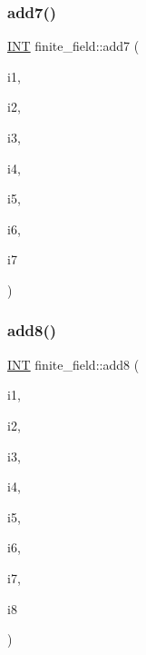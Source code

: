 \mbox{\label{classfinite__field_a19120d114e955baea2cf5d27c459fac1}} 
\subsubsection{\texorpdfstring{add7()}{add7()}}
{\footnotesize\ttfamily \mbox{\hyperlink{galois_8h_a09fddde158a3a20bd2dcadb609de11dc}{I\+NT}} finite\+\_\+field\+::add7 (\begin{DoxyParamCaption}\item[{\mbox{\hyperlink{galois_8h_a09fddde158a3a20bd2dcadb609de11dc}{I\+NT}}}]{i1,  }\item[{\mbox{\hyperlink{galois_8h_a09fddde158a3a20bd2dcadb609de11dc}{I\+NT}}}]{i2,  }\item[{\mbox{\hyperlink{galois_8h_a09fddde158a3a20bd2dcadb609de11dc}{I\+NT}}}]{i3,  }\item[{\mbox{\hyperlink{galois_8h_a09fddde158a3a20bd2dcadb609de11dc}{I\+NT}}}]{i4,  }\item[{\mbox{\hyperlink{galois_8h_a09fddde158a3a20bd2dcadb609de11dc}{I\+NT}}}]{i5,  }\item[{\mbox{\hyperlink{galois_8h_a09fddde158a3a20bd2dcadb609de11dc}{I\+NT}}}]{i6,  }\item[{\mbox{\hyperlink{galois_8h_a09fddde158a3a20bd2dcadb609de11dc}{I\+NT}}}]{i7 }\end{DoxyParamCaption})}

\mbox{\label{classfinite__field_ae32c75625447b15a27d0309ce0ade90e}} 
\subsubsection{\texorpdfstring{add8()}{add8()}}
{\footnotesize\ttfamily \mbox{\hyperlink{galois_8h_a09fddde158a3a20bd2dcadb609de11dc}{I\+NT}} finite\+\_\+field\+::add8 (\begin{DoxyParamCaption}\item[{\mbox{\hyperlink{galois_8h_a09fddde158a3a20bd2dcadb609de11dc}{I\+NT}}}]{i1,  }\item[{\mbox{\hyperlink{galois_8h_a09fddde158a3a20bd2dcadb609de11dc}{I\+NT}}}]{i2,  }\item[{\mbox{\hyperlink{galois_8h_a09fddde158a3a20bd2dcadb609de11dc}{I\+NT}}}]{i3,  }\item[{\mbox{\hyperlink{galois_8h_a09fddde158a3a20bd2dcadb609de11dc}{I\+NT}}}]{i4,  }\item[{\mbox{\hyperlink{galois_8h_a09fddde158a3a20bd2dcadb609de11dc}{I\+NT}}}]{i5,  }\item[{\mbox{\hyperlink{galois_8h_a09fddde158a3a20bd2dcadb609de11dc}{I\+NT}}}]{i6,  }\item[{\mbox{\hyperlink{galois_8h_a09fddde158a3a20bd2dcadb609de11dc}{I\+NT}}}]{i7,  }\item[{\mbox{\hyperlink{galois_8h_a09fddde158a3a20bd2dcadb609de11dc}{I\+NT}}}]{i8 }\end{DoxyParamCaption})}

